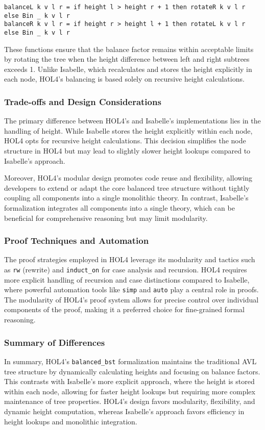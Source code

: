 \documentclass[12pt]{article}
\begin{document}
\begin{verbatim}
balanceL k v l r = if height l > height r + 1 then rotateR k v l r else Bin _ k v l r
balanceR k v l r = if height r > height l + 1 then rotateL k v l r else Bin _ k v l r
\end{verbatim}

These functions ensure that the balance factor remains within acceptable limits by rotating the tree when the height difference between left and right subtrees exceeds 1. Unlike Isabelle, which recalculates and stores the height explicitly in each node, HOL4’s balancing is based solely on recursive height calculations.

\subsubsection{Trade-offs and Design Considerations}
The primary difference between HOL4’s and Isabelle’s implementations lies in the handling of height. While Isabelle stores the height explicitly within each node, HOL4 opts for recursive height calculations. This decision simplifies the node structure in HOL4 but may lead to slightly slower height lookups compared to Isabelle’s approach.

Moreover, HOL4's modular design promotes code reuse and flexibility, allowing developers to extend or adapt the core balanced tree structure without tightly coupling all components into a single monolithic theory. In contrast, Isabelle's formalization integrates all components into a single theory, which can be beneficial for comprehensive reasoning but may limit modularity.

\subsubsection{Proof Techniques and Automation}
The proof strategies employed in HOL4 leverage its modularity and tactics such as \texttt{rw} (rewrite) and \texttt{induct\_on} for case analysis and recursion. HOL4 requires more explicit handling of recursion and case distinctions compared to Isabelle, where powerful automation tools like \texttt{simp} and \texttt{auto} play a central role in proofs. The modularity of HOL4’s proof system allows for precise control over individual components of the proof, making it a preferred choice for fine-grained formal reasoning.

\subsubsection{Summary of Differences}
In summary, HOL4’s \texttt{balanced\_bst} formalization maintains the traditional AVL tree structure by dynamically calculating heights and focusing on balance factors. This contrasts with Isabelle’s more explicit approach, where the height is stored within each node, allowing for faster height lookups but requiring more complex maintenance of tree properties. HOL4’s design favors modularity, flexibility, and dynamic height computation, whereas Isabelle’s approach favors efficiency in height lookups and monolithic integration.
\end{document}
